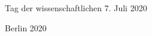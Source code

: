 \begin{titlepage}
\begin{center}
\begin{varwidth}{\textwidth}
      Tag der wissenschaftlichen 7. Juli 2020
    \end{varwidth}
  \end{center}
  \vspace{0.65cm}
  \begin{center}
    Berlin 2020

    \vfill

    {\textcolor{white}{\sffamily\docdate}}
  \end{center}
\end{titlepage}
